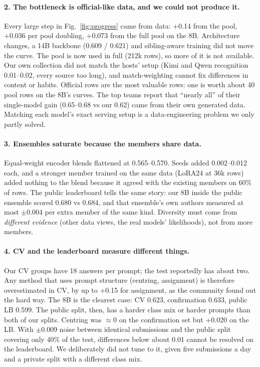 \documentclass[10pt,twocolumn,letterpaper]{article}
\begin{document}
\paragraph{2. The bottleneck is official-like data, and we could not produce it.} Every large step in Fig.~\ref{fig:progress} came from data: +0.14 from the pool, +0.036 per pool doubling, +0.073 from the full pool on the 8B. Architecture changes, a 14B backbone (0.609 / 0.621) and sibling-aware training did not move the curve. The pool is now used in full (212k rows), so more of it is not available. Our own collection did not match the hosts' setup (Kimi and Qwen recognition 0.01--0.02, every source too long), and match-weighting cannot fix differences in content or habits. Official rows are the most valuable rows: one is worth about 40 pool rows on the 8B's curves. The top teams report that ``nearly all'' of their single-model gain (0.65--0.68 vs our 0.62) came from their own generated data. Matching each model's exact serving setup is a data-engineering problem we only partly solved.

\paragraph{3. Ensembles saturate because the members share data.} Equal-weight encoder blends flattened at 0.565--0.570. Seeds added 0.002--0.012 each, and a stronger member trained on the same data (LoRA24 at 36k rows) added nothing to the blend because it agreed with the existing members on 60\% of rows. The public leaderboard tells the same story: our 8B inside the public ensemble scored 0.680 vs 0.684, and that ensemble's own authors measured at most $\pm$0.004 per extra member of the same kind. Diversity must come from \emph{different evidence} (other data views, the real models' likelihoods), not from more members.

\paragraph{4. CV and the leaderboard measure different things.} Our CV groups have 18 answers per prompt; the test reportedly has about two. Any method that uses prompt structure (centring, assignment) is therefore overestimated in CV, by up to +0.15 for assignment, as the community found out the hard way. The 8B is the clearest case: CV 0.623, confirmation 0.633, public LB 0.599. The public split, then, has a harder class mix or harder prompts than both of our splits. Centring was $\approx$0 on the confirmation set but +0.020 on the LB. With $\pm$0.009 noise between identical submissions and the public split covering only 40\% of the test, differences below about 0.01 cannot be resolved on the leaderboard. We deliberately did not tune to it, given five submissions a day and a private split with a different class mix.
\end{document}
